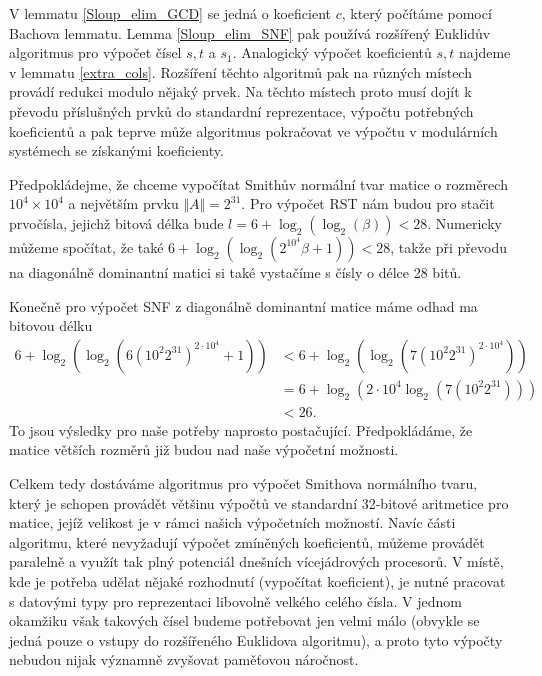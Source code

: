 V lemmatu \ref{Sloup_elim_GCD} se jedná o koeficient $ c $, který počítáme 
pomocí Bachova lemmatu. Lemma \ref{Sloup_elim_SNF} pak používá rozšířený 
Euklidův algoritmus pro výpočet čísel $ s, t $ a $ s_1 $. Analogický výpočet 
koeficientů $ s, t $ najdeme v lemmatu \ref{extra_cols}. Rozšíření těchto 
algoritmů pak na různých místech provádí redukci modulo nějaký prvek. Na těchto 
místech proto musí dojít k převodu příslušných prvků do standardní reprezentace, 
výpočtu potřebných koeficientů a pak teprve může algoritmus pokračovat ve 
výpočtu v modulárních systémech se získanými koeficienty.

\begin{pri}
Předpokládejme, že chceme vypočítat Smithův normální tvar matice o rozměrech
$ 10^4 \times 10^4 $ a největším prvku $ \Vert A \Vert = 2^{31} $. Pro výpočet 
RST nám budou pro stačit prvočísla, jejichž bitová délka bude 
$ l = 6 + \log_2(\log_2(\beta)) < 28 $. Numericky můžeme spočítat, že také
$ 6 + \log_2(\log_2(2^{10^4} \beta + 1)) < 28 $, takže při převodu na diagonálně
dominantní matici si také vystačíme s čísly o délce 28 bitů.

Konečně pro výpočet SNF z diagonálně dominantní matice máme odhad ma bitovou 
délku 
\begin{align*}
    6 + \log_2(\log_2(6 (10^{2} 2^{31})^{2 \cdot 10^4} + 1)) 
        & < 6 + \log_2(\log_2(7 (10^{2} 2^{31})^{2 \cdot 10^4})) \\
        & = 6 + \log_2(2 \cdot 10^4 \log_2(7 (10^{2} 2^{31})))   \\
        & < 26.
\end{align*}
To jsou výsledky pro naše potřeby naprosto postačující. Předpokládáme, 
že matice větších rozměrů již budou nad naše výpočetní možnosti.
\end{pri}

Celkem tedy dostáváme algoritmus pro výpočet Smithova normálního tvaru, který
je schopen provádět většinu výpočtů ve standardní 32-bitové aritmetice pro 
matice, jejíž velikost je v rámci našich výpočetních možností. Navíc části
algoritmu, které nevyžadují výpočet zmíněných koeficientů, můžeme provádět
paralelně a využít tak plný potenciál dnešních vícejádrových procesorů.
V místě, kde je potřeba udělat nějaké rozhodnutí (vypočítat koeficient),
je nutné pracovat s datovými typy pro reprezentaci libovolně velkého celého
čísla. V jednom okamžiku však takových čísel budeme potřebovat jen velmi málo
(obvykle se jedná pouze o vstupy do rozšířeného Euklidova algoritmu), a proto
tyto výpočty nebudou nijak významně zvyšovat paměťovou náročnost.
